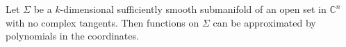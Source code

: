 
Let $\Sigma$ be a $k$-dimensional sufficiently smooth submanifold of an open set in $\mathbb{C}^n$ with no complex tangents. Then functions on $\Sigma$ can be approximated by polynomials in the coordinates.
